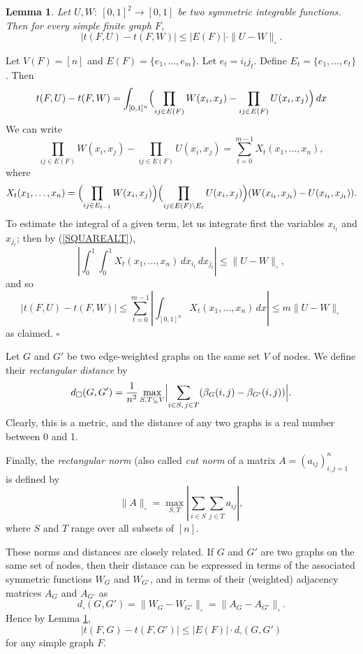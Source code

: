\documentclass[fleqn]{article}
\newtheorem{lemma}[theorem]{Lemma}
\newenvironment{proof}{\noindent{\bf Proof. }}{\hfill$\square$\medskip}
\begin{document}
\begin{lemma}\label{HOMSQUARE}
Let $U,W:~[0,1]^2\to[0,1]$ be two symmetric integrable functions.
Then for every simple finite graph $F$,
\[
|t(F,U)-t(F,W)|\le |E(F)|\cdot\|U-W\|_\square.
\]
\end{lemma}

\begin{proof}
Let $V(F)=[n]$ and $E(F)=\{e_1,\dots,e_m\}$. Let $e_t=i_tj_t$. Define
$E_t=\{e_1,\dots,e_t\}$. Then
\[
t(F,U)-t(F,W)=\int_{[0,1]^n} \Bigl(\prod_{ij\in E(F)}
W(x_i,x_j)-\prod_{ij\in E(F)} U(x_i,x_j)\Bigr)\,dx\Bigr.
\]
We can write
\[
\prod_{ij\in E(F)} W(x_i,x_j)-\prod_{ij\in E(F)}
U(x_i,x_j)=\sum_{t=0}^{m-1} X_t(x_1,\dots,x_n),
\]
where
\[
X_t(x_1,\dots,x_n) = \Bigl(\prod_{ij\in E_{t-1}} W(x_i,x_j)\Bigr)
\Bigl(\prod_{ij\in E(F)\setminus E_{t}}
U(x_i,x_j)\Bigr)(W(x_{i_t},x_{j_t})- U(x_{i_t},x_{j_t})).
\]
To estimate the integral of a given term, let us integrate first the
variables $x_{i_t}$ and $x_{j_t}$; then by (\ref{SQUAREALT}),
\[
\left|\int_0^1\int_0^1 X_t(x_1,\dots,x_n)\,dx_{i_t}\,dx_{j_t} \right|
\le \|U-W\|_\square,
\]
and so
\[
|t(F,U)-t(F,W)|\le \sum_{t=0}^{m-1}\left|\int_{[0,1]^n}
X_t(x_1,\dots,x_n) \,dx \right| \le m\|U-W\|_\square
\]
as claimed.
\end{proof}

Let $G$ and $G'$ be two edge-weighted graphs on the same set $V$ of
nodes. We define their {\it  rectangular distance} by
\[
d_\square(G,G')= \frac{1}{n^2} \max_{S,T\subseteq V} \Bigl|\sum_{i\in
S,\,j\in T} (\beta_G(i,j)-\beta_{G'}(i,j))\Bigr|.
\]
Clearly, this is a metric, and the distance of any two graphs is a
real number between 0 and 1.

Finally, the {\it rectangular norm} (also called {\it cut norm} of a
matrix $A=(a_{ij})_{i,j=1}^n$ is defined by
\[
\|A\|_\square = \max_{S,T} \left| \sum_{i\in S}\sum_{j\in T}
a_{ij}\right|,
\]
where $S$ and $T$ range over all subsets of $[n]$.

These norms and distances are closely related. If $G$ and $G'$ are
two graphs on the same set of nodes, then their distance can be
expressed in terms of the associated symmetric functions $W_G$ and
$W_{G'}$, and in terms of their (weighted) adjacency matrices $A_G$
and $A_{G'}$ as
\[
d_\square(G,G')=\|W_G-W_{G'}\|_\square=\|A_G-A_{G'}\|_\square.
\]
Hence by Lemma \ref{HOMSQUARE},
\begin{equation}\label{LEFTDIST}
|t(F,G)-t(F,G')|\le |E(F)|\cdot d_\square(G,G')
\end{equation}
for any simple graph $F$.
\end{document}
